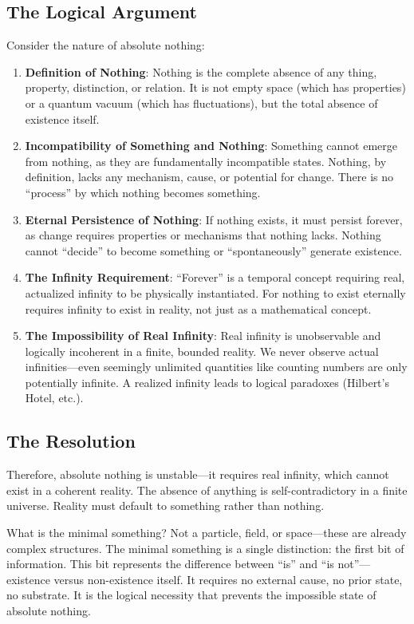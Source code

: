 \documentclass{article}
\begin{document}
\subsection{The Logical Argument}
Consider the nature of absolute nothing:
\begin{enumerate}
\item \textbf{Definition of Nothing}: Nothing is the complete absence of any thing, property, distinction, or relation. It is not empty space (which has properties) or a quantum vacuum (which has fluctuations), but the total absence of existence itself.
\item \textbf{Incompatibility of Something and Nothing}: Something cannot emerge from nothing, as they are fundamentally incompatible states. Nothing, by definition, lacks any mechanism, cause, or potential for change. There is no ``process'' by which nothing becomes something.
\item \textbf{Eternal Persistence of Nothing}: If nothing exists, it must persist forever, as change requires properties or mechanisms that nothing lacks. Nothing cannot ``decide'' to become something or ``spontaneously'' generate existence.
\item \textbf{The Infinity Requirement}: ``Forever'' is a temporal concept requiring real, actualized infinity to be physically instantiated. For nothing to exist eternally requires infinity to exist in reality, not just as a mathematical concept.
\item \textbf{The Impossibility of Real Infinity}: Real infinity is unobservable and logically incoherent in a finite, bounded reality. We never observe actual infinities—even seemingly unlimited quantities like counting numbers are only potentially infinite. A realized infinity leads to logical paradoxes (Hilbert's Hotel, etc.).
\end{enumerate}

\subsection{The Resolution}
Therefore, absolute nothing is unstable—it requires real infinity, which cannot exist in a coherent reality. The absence of anything is self-contradictory in a finite universe. Reality must default to something rather than nothing.

What is the minimal something? Not a particle, field, or space—these are already complex structures. The minimal something is a single distinction: the first bit of information. This bit represents the difference between ``is'' and ``is not''—existence versus non-existence itself. It requires no external cause, no prior state, no substrate. It is the logical necessity that prevents the impossible state of absolute nothing.
\end{document}
